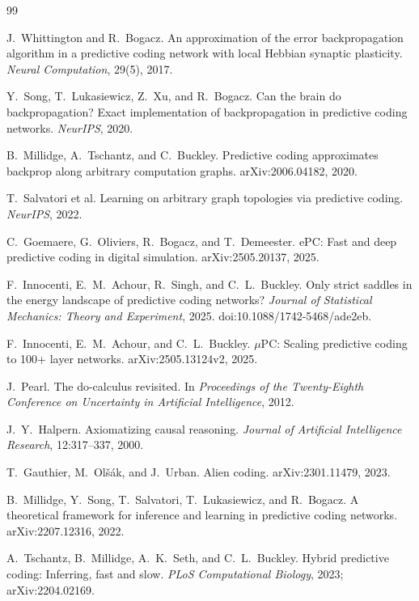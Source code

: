 \documentclass[11pt]{article}
\begin{document}
\begin{thebibliography}{99}

 J.~Whittington and R.~Bogacz.
An approximation of the error backpropagation algorithm in a predictive coding network
with local Hebbian synaptic plasticity. \emph{Neural Computation}, 29(5), 2017.

 Y.~Song, T.~Lukasiewicz, Z.~Xu, and R.~Bogacz.
Can the brain do backpropagation? Exact implementation of backpropagation in predictive
coding networks. \emph{NeurIPS}, 2020.

 B.~Millidge, A.~Tschantz, and C.~Buckley.
Predictive coding approximates backprop along arbitrary computation graphs.
arXiv:2006.04182, 2020.

 T.~Salvatori et al.
Learning on arbitrary graph topologies via predictive coding. \emph{NeurIPS}, 2022.

 C.~Goemaere, G.~Oliviers, R.~Bogacz, and T.~Demeester.
ePC: Fast and deep predictive coding in digital simulation. arXiv:2505.20137, 2025.

 F.~Innocenti, E.~M.~Achour, R.~Singh, and C.~L.~Buckley.
Only strict saddles in the energy landscape of predictive coding networks?
\emph{Journal of Statistical Mechanics: Theory and Experiment}, 2025.
doi:10.1088/1742-5468/ade2eb.

 F.~Innocenti, E.~M.~Achour, and C.~L.~Buckley.
$\mu$PC: Scaling predictive coding to 100+ layer networks.
arXiv:2505.13124v2, 2025.

 J.~Pearl.
The do-calculus revisited.
In \emph{Proceedings of the Twenty-Eighth Conference on Uncertainty in Artificial
Intelligence}, 2012.

 J.~Y.~Halpern.
Axiomatizing causal reasoning.
\emph{Journal of Artificial Intelligence Research}, 12:317--337, 2000.

 T.~Gauthier, M.~Ol\v{s}\'ak, and J.~Urban.
Alien coding. arXiv:2301.11479, 2023.

 B.~Millidge, Y.~Song, T.~Salvatori, T.~Lukasiewicz, and R.~Bogacz.
A theoretical framework for inference and learning in predictive coding networks.
arXiv:2207.12316, 2022.

 A.~Tschantz, B.~Millidge, A.~K.~Seth, and C.~L.~Buckley.
Hybrid predictive coding: Inferring, fast and slow.
\emph{PLoS Computational Biology}, 2023; arXiv:2204.02169.


\end{thebibliography}
\end{document}
